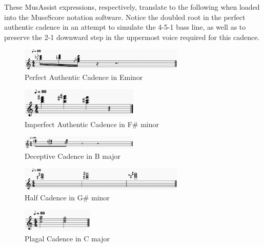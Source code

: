 \documentclass{report}
\begin{document}
These MusAssist expressions,  respectively, translate to the following when loaded into the MuseScore notation software. Notice the doubled root in the perfect authentic cadence in an attempt to simulate the 4-5-1 bass line, as well as to preserve the 2-1 downward step in the uppermost voice required for this cadence. 
\begin{figure}[h!]
\centering
\includegraphics[width=0.7\textwidth]{images/perfauth}
  \caption{Perfect Authentic Cadence in E\musFlat minor}
\end{figure}

\begin{figure}[h!]
\centering
\includegraphics[width=0.5\textwidth]{images/imperfauth}
  \caption{Imperfect Authentic Cadence in F\# minor}
\end{figure}

\begin{figure}[h!]
\centering
\includegraphics[width=0.5\textwidth]{images/deceptive}
  \caption{Deceptive Cadence in B major}
\end{figure}

\begin{figure}[h!]
\centering
\includegraphics[width=0.7\textwidth]{images/half}
  \caption{Half Cadence in G\# minor}
\end{figure}

\begin{figure}[h!]
\centering
\includegraphics[width=0.3\textwidth]{images/plagal}
  \caption{Plagal Cadence in C major}
\end{figure}

\end{document}
